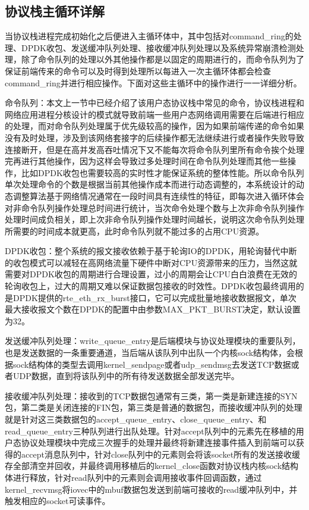 \subsection{协议栈主循环详解} %
当协议栈进程完成初始化之后便进入主循环体中，其中包括对command\_ring的处理、DPDK收包、发送缓冲队列处理、接收缓冲队列处理以及系统异常崩溃检测处理，除了命令队列的处理以外其他操作都是以固定的周期进行的，而命令队列为了保证前端传来的命令可以及时得到处理所以每进入一次主循环体都会检查command\_ring并进行相应操作。下面对这些主循环中的操作进行一一详细分析。

命令队列：本文上一节中已经介绍了该用户态协议栈中常见的命令，协议栈进程和网络应用进程分核设计的模式就导致前端一些用户态网络调用需要在后端进行相应的处理，而对命令队列处理属于优先级较高的操作，因为如果前端传递的命令如果没有及时处理，涉及到该网络套接字的后续操作都无法继续进行或者操作失败导致连接断开，但是在高并发高吞吐情况下又不能每次将命令队列里所有命令挨个处理完再进行其他操作，因为这样会导致过多处理时间在命令队列处理而其他一些操作，比如DPDK收包也需要较高的实时性才能保证系统的整体性能。所以命令队列单次处理命令的个数是根据当前其他操作成本而进行动态调整的，本系统设计的动态调整算法基于网络情况通常在一段时间具有连续性的特征，即每次进入循环体会对非命令队列操作处理总时间进行统计，当次命令处理个数与上次非命令队列操作处理时间成负相关，即上次非命令队列操作处理时间越长，说明这次命令队列处理所需要的时间成本就更高，此时命令队列就不能过多的占用CPU资源。

DPDK收包：整个系统的报文接收依赖于基于轮询IO的DPDK，用轮询替代中断的收包模式可以减轻在高网络流量下硬件中断对CPU资源带来的压力，当然这就需要对DPDK收包的周期进行合理设置，过小的周期会让CPU白白浪费在无效的轮询收包上，过大的周期又难以保证数据包接收的时效性。DPDK收包最终调用的是DPDK提供的rte\_eth\_rx\_burst接口，它可以完成批量地接收数据报文，单次最大接收报文个数在DPDK的配置中由参数MAX\_PKT\_BURST决定，默认设置为32。

发送缓冲队列处理：write\_queue\_entry是后端模块与协议处理模块的重要队列，也是发送数据的一条重要通道，当后端从该队列中出队一个内核sock结构体，会根据sock结构体的类型去调用kernel\_sendpage或者udp\_sendmsg去发送TCP数据或者UDP数据，直到将该队列中的所有待发送数据全部发送完毕。

接收缓冲队列处理：接收到的TCP数据包通常有三类，第一类是新建连接的SYN包，第二类是关闭连接的FIN包，第三类是普通的数据包，而接收缓冲队列的处理就是针对这三类数据包的accept\_queue\_entry、close\_queue\_entry、和read\_queue\_entry三种队列进行出队处理。针对accept队列中的元素先在移植的用户态协议处理模块中完成三次握手的处理并最终将新建连接事件插入到前端可以获得的accept消息队列中，针对close队列中的元素则会将该socket所有的发送接收缓存全部清空并回收，并最终调用移植后的kernel\_close函数对协议栈内核sock结构体进行释放，针对read队列中的元素则会调用接收事件回调函数，通过kernel\_recvmsg将iovec中的mbuf数据包发送到前端可接收的read缓冲队列中，并触发相应的socket可读事件。

